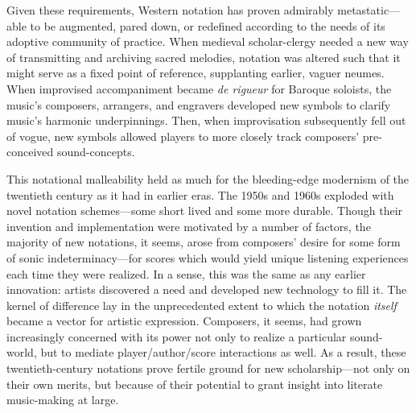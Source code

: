 Given these requirements, Western notation has proven admirably metastatic---able to be augmented, pared down, or redefined according to the needs of its adoptive community of practice.
When medieval scholar-clergy needed a new way of transmitting and archiving sacred melodies, notation was altered such that it might serve as a fixed point of reference, supplanting earlier, vaguer neumes.
When improvised accompaniment became \textit{de rigueur} for Baroque soloists, the music's composers, arrangers, and engravers developed new symbols to clarify music's harmonic underpinnings.
Then, when improvisation subsequently fell out of vogue, new symbols allowed players to more closely track composers' pre-conceived sound-concepts.


This notational malleability held as much for the bleeding-edge modernism of the twentieth century as it had in earlier eras.
The 1950s and 1960s exploded with novel notation schemes---some short lived and some more durable.
Though their invention and implementation were motivated by a number of factors, the majority of new notations, it seems, arose from composers' desire for some form of sonic indeterminacy---for scores which would yield unique listening experiences each time they were realized.
In a sense, this was the same as any earlier innovation: artists discovered a need and developed new technology to fill it. The kernel of difference lay in the unprecedented extent to which the notation \textit{itself} became a vector for artistic expression.
Composers, it seems, had grown increasingly concerned with its power not only to realize a particular sound-world, but to mediate player/author/score interactions as well.
As a result, these twentieth-century notations prove fertile ground for new scholarship---not only on their own merits, but because of their potential to grant insight into literate music-making at large.

